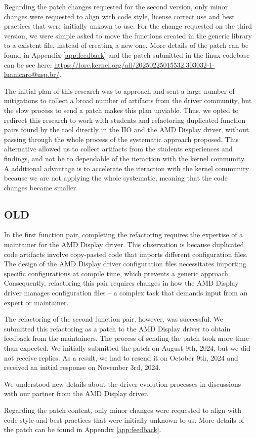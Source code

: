 Regarding the patch changes requested for the second version, 
only minor changes were requested to align with code style, license correct use and best practices that
were initially unkown to use. For the change requested on the third version, we were simple asked to 
move the functions created in the generic library to a existent file, instead of creating a new one.
More details of the patch can be found in Appendix \ref{app:feedback} and the patch submitted in 
the linux codebase can be see here: \url{https://lore.kernel.org/all/20250225015532.303032-1-luanicaro@usp.br/}.

The initial plan of this research was to approach and sent a large number of mitigations to
collect a broad number of artifacts from the driver community, but the slow process to send a patch
makes this plan unviable. Thus, we opted to redirect this research to work with students and refactoring duplicated function
pairs found by the tool directly in the IIO and the AMD Display driver, without passing through the whole process 
of the systematic approach proposed.
This alternative allowed us to collect artifacts from the students experiences and findings, and not be 
to dependable of the iteraction with the kernel community.
A additional advantage is to accelerate the iteraction with the kernel community
because we are not applying the whole systematic, meaning that the code changes became smaller.

\subsection{OLD}

In the first function pair, completing the refactoring requires the expertise of a maintainer for the AMD Display driver. 
This observation is because duplicated code artifacts involve copy-pasted code that imports different configuration files.
The design of the AMD Display driver configuration files necessitates importing specific configurations at compile time, 
which prevents a generic approach. Consequently, refactoring this pair requires changes in how the AMD Display driver 
manages configuration files -- a complex task that demands input from an expert or maintainer.

The refactoring of the second function pair, however, was successful. We submitted this refactoring as a patch to the AMD 
Display driver to obtain feedback from the maintainers. The process of sending the patch took more time than expected.
We initially submitted the patch on August 9th, 2024, but we did not receive replies. As a result, we had to resend 
it on October 9th, 2024 and received an initial response on November 3rd, 2024. 

We understood new details about the driver evolution processes in discussions with our partner from the AMD Display driver.


Regarding the patch content, only minor changes were requested to align with code 
style and best practices that were initially unknown to us. More details of the 
patch can be found in Appendix \ref{app:feedback}.

